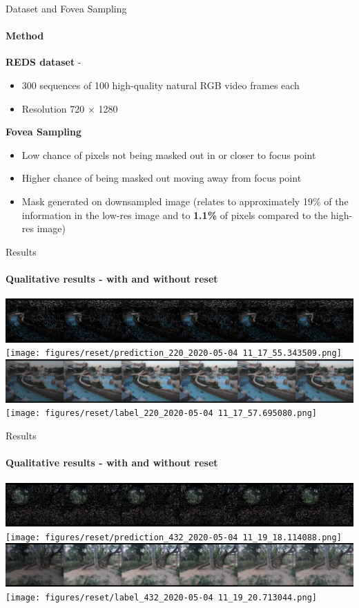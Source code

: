 \documentclass[
	ngerman,
	aspectratio=169,
	color={accentcolor=3d},
	logo=false,
	colorframetitle=true,
	]{tudabeamer}
\begin{document}
\begin{frame}{Dataset and Fovea Sampling}
\framesubtitle{Method}
\textbf{REDS dataset} - \citet{REDS}
\begin{itemize}
    \item 300 sequences of 100 high-quality natural RGB video frames each
    \item Resolution 720 $\times$ 1280
\end{itemize}
\textbf{Fovea Sampling}
\begin{itemize}
    \item Low chance of pixels not being masked out in or closer to focus point
    \item Higher chance of being masked out moving away from focus point
    \item Mask generated on downsampled image (relates to approximately 19\% of the information in the low-res image and to \textbf{1.1\%} of pixels compared to the high-res image)
\end{itemize}
\end{frame}

\begin{frame}{Results}
    \framesubtitle{Qualitative results - with and without reset}
    \begin{center}
    \includegraphics[width=0.75\linewidth]{figures/reset/input_220_2020-05-04 11_17_59.593499.png}
    \texttt{[image: figures/reset/prediction\_220\_2020-05-04 11\_17\_55.343509.png]}
    \includegraphics[width=0.75\linewidth]{figures/no_rest/prediction_220_2020-05-06 09_57_18.378952.png}
    \texttt{[image: figures/reset/label\_220\_2020-05-04 11\_17\_57.695080.png]}
    \end{center}
\end{frame}

\begin{frame}{Results}
    \framesubtitle{Qualitative results - with and without reset}
    \begin{center}
    \includegraphics[width=0.75\linewidth]{figures/reset/input_432_2020-05-04 11_19_22.304534.png}
    \texttt{[image: figures/reset/prediction\_432\_2020-05-04 11\_19\_18.114088.png]}
    \includegraphics[width=0.75\linewidth]{figures/no_rest/prediction_432_2020-05-06 09_58_40.811600.png}
    \texttt{[image: figures/reset/label\_432\_2020-05-04 11\_19\_20.713044.png]}
    \end{center}
\end{frame}
\end{document}
